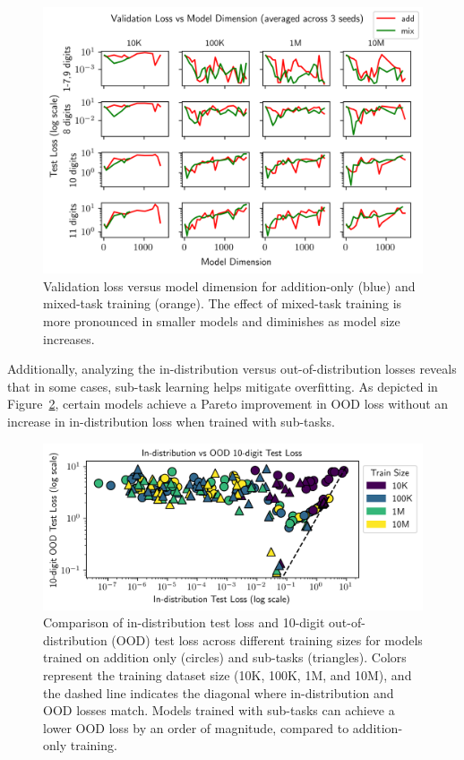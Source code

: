 \begin{figure}[h!]
    \centering
    \includegraphics[width=\textwidth]{fig/exp_27_val_loss_vs_n_embd.png}
    \caption{Validation loss versus model dimension for addition-only (blue) and mixed-task training (orange). The effect of mixed-task training is more pronounced in smaller models and diminishes as model size increases.}
    \label{fig:exp_27_val_loss_vs_n_embd}
\end{figure}

Additionally, analyzing the in-distribution versus out-of-distribution losses reveals that in some cases, sub-task learning helps mitigate overfitting. As depicted in Figure~\ref{fig:subtask_overfitting}, certain models achieve a Pareto improvement in OOD loss without an increase in in-distribution loss when trained with sub-tasks.

\begin{figure}[h!]
    \centering
    \includegraphics[width=\textwidth]{fig/subtask_overfitting.png}
    \caption{Comparison of in-distribution test loss and 10-digit out-of-distribution (OOD) test loss across different training sizes for models trained on addition only (circles) and sub-tasks (triangles). Colors represent the training dataset size (10K, 100K, 1M, and 10M), and the dashed line indicates the diagonal where in-distribution and OOD losses match. Models trained with sub-tasks can achieve a lower OOD loss by an order of magnitude, compared to addition-only training.}
    \label{fig:subtask_overfitting}
\end{figure}

